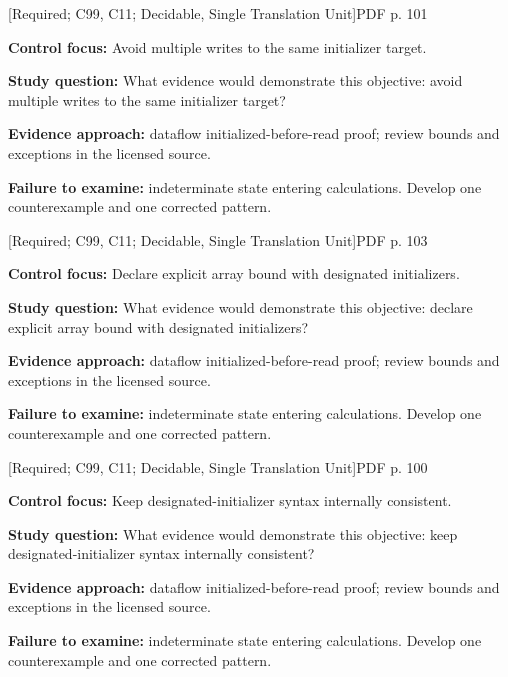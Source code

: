 \documentclass[10pt,letterpaper]{article}
\begin{document}
\smallskip
{}
 \textsf{\footnotesize [Required; C99, C11; Decidable, Single Translation Unit]}\hfill{\footnotesize PDF p. 101}\par
\textbf{Control focus:} Avoid multiple writes to the same initializer target.\par
\textbf{Study question:} What evidence would demonstrate this objective: avoid multiple writes to the same initializer target?\par
\textbf{Evidence approach:} dataflow initialized-before-read proof; review bounds and exceptions in the licensed source.\par
\textbf{Failure to examine:} indeterminate state entering calculations. Develop one counterexample and one corrected pattern.\par
\smallskip
{}
 \textsf{\footnotesize [Required; C99, C11; Decidable, Single Translation Unit]}\hfill{\footnotesize PDF p. 103}\par
\textbf{Control focus:} Declare explicit array bound with designated initializers.\par
\textbf{Study question:} What evidence would demonstrate this objective: declare explicit array bound with designated initializers?\par
\textbf{Evidence approach:} dataflow initialized-before-read proof; review bounds and exceptions in the licensed source.\par
\textbf{Failure to examine:} indeterminate state entering calculations. Develop one counterexample and one corrected pattern.\par
\smallskip
{}
 \textsf{\footnotesize [Required; C99, C11; Decidable, Single Translation Unit]}\hfill{\footnotesize PDF p. 100}\par
\textbf{Control focus:} Keep designated-initializer syntax internally consistent.\par
\textbf{Study question:} What evidence would demonstrate this objective: keep designated-initializer syntax internally consistent?\par
\textbf{Evidence approach:} dataflow initialized-before-read proof; review bounds and exceptions in the licensed source.\par
\textbf{Failure to examine:} indeterminate state entering calculations. Develop one counterexample and one corrected pattern.\par
\end{document}
